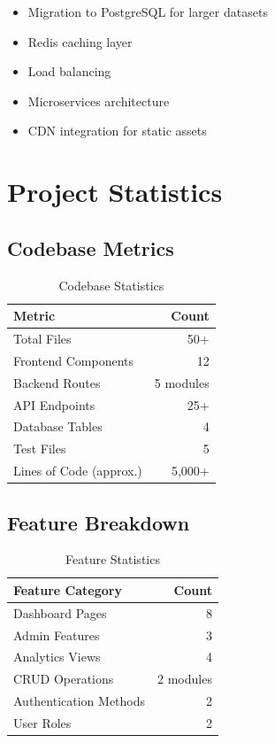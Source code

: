 \documentclass[12pt,a4paper]{article}
\begin{document}
\begin{itemize}[leftmargin=*]
    \item Migration to PostgreSQL for larger datasets
    \item Redis caching layer
    \item Load balancing
    \item Microservices architecture
    \item CDN integration for static assets
\end{itemize}

\newpage

\section{Project Statistics}


\subsection{Codebase Metrics}

\begin{table}[h]
\centering
\begin{tabular}{|l|r|}
\hline
\textbf{Metric} & \textbf{Count} \\
\hline
Total Files & 50+ \\
\hline
Frontend Components & 12 \\
\hline
Backend Routes & 5 modules \\
\hline
API Endpoints & 25+ \\
\hline
Database Tables & 4 \\
\hline
Test Files & 5 \\
\hline
Lines of Code (approx.) & 5,000+ \\
\hline
\end{tabular}
\caption{Codebase Statistics}
\end{table}

\subsection{Feature Breakdown}

\begin{table}[h]
\centering
\begin{tabular}{|l|r|}
\hline
\textbf{Feature Category} & \textbf{Count} \\
\hline
Dashboard Pages & 8 \\
\hline
Admin Features & 3 \\
\hline
Analytics Views & 4 \\
\hline
CRUD Operations & 2 modules \\
\hline
Authentication Methods & 2 \\
\hline
User Roles & 2 \\
\hline
\end{tabular}
\caption{Feature Statistics}
\end{table}
\end{document}
